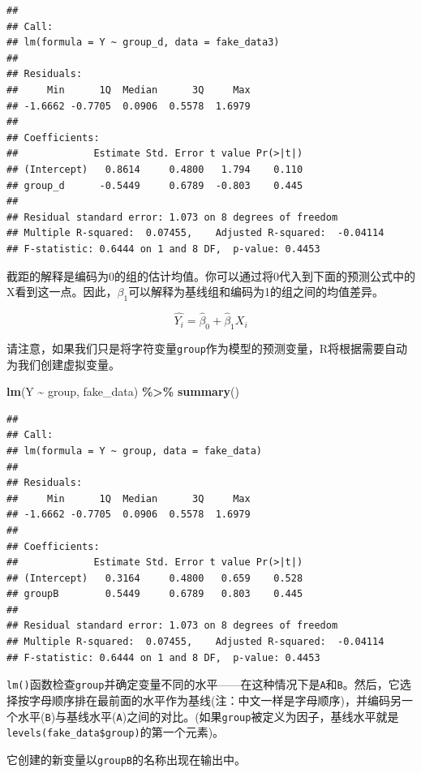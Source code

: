 \documentclass[
]{book}
\newenvironment{Shaded}{\begin{snugshade}}{\end{snugshade}}
\newcommand{\FunctionTok}[1]{\textcolor[rgb]{0.13,0.29,0.53}{\textbf{#1}}}
\newcommand{\NormalTok}[1]{#1}
\newcommand{\SpecialCharTok}[1]{\textcolor[rgb]{0.81,0.36,0.00}{\textbf{#1}}}
\begin{document}
\begin{verbatim}
## 
## Call:
## lm(formula = Y ~ group_d, data = fake_data3)
## 
## Residuals:
##     Min      1Q  Median      3Q     Max 
## -1.6662 -0.7705  0.0906  0.5578  1.6979 
## 
## Coefficients:
##             Estimate Std. Error t value Pr(>|t|)
## (Intercept)   0.8614     0.4800   1.794    0.110
## group_d      -0.5449     0.6789  -0.803    0.445
## 
## Residual standard error: 1.073 on 8 degrees of freedom
## Multiple R-squared:  0.07455,    Adjusted R-squared:  -0.04114 
## F-statistic: 0.6444 on 1 and 8 DF,  p-value: 0.4453
\end{verbatim}

截距的解释是编码为0的组的估计均值。你可以通过将0代入到下面的预测公式中的X看到这一点。因此，\(\beta_1\)可以解释为基线组和编码为1的组之间的均值差异。

\[\hat{Y_i} = \hat{\beta}_0 + \hat{\beta}_1 X_i \]

请注意，如果我们只是将字符变量\texttt{group}作为模型的预测变量，R将根据需要自动为我们创建虚拟变量。

\begin{Shaded}
\begin{Highlighting}[]
\FunctionTok{lm}\NormalTok{(Y }\SpecialCharTok{\textasciitilde{}}\NormalTok{ group, fake\_data) }\SpecialCharTok{\%\textgreater{}\%}
  \FunctionTok{summary}\NormalTok{()}
\end{Highlighting}
\end{Shaded}

\begin{verbatim}
## 
## Call:
## lm(formula = Y ~ group, data = fake_data)
## 
## Residuals:
##     Min      1Q  Median      3Q     Max 
## -1.6662 -0.7705  0.0906  0.5578  1.6979 
## 
## Coefficients:
##             Estimate Std. Error t value Pr(>|t|)
## (Intercept)   0.3164     0.4800   0.659    0.528
## groupB        0.5449     0.6789   0.803    0.445
## 
## Residual standard error: 1.073 on 8 degrees of freedom
## Multiple R-squared:  0.07455,    Adjusted R-squared:  -0.04114 
## F-statistic: 0.6444 on 1 and 8 DF,  p-value: 0.4453
\end{verbatim}

\texttt{lm()}函数检查\texttt{group}并确定变量不同的水平------在这种情况下是\texttt{A}和\texttt{B}。然后，它选择按字母顺序排在最前面的水平作为基线(注：中文一样是字母顺序)，并编码另一个水平(\texttt{B})与基线水平(\texttt{A})之间的对比。(如果\texttt{group}被定义为因子，基线水平就是\texttt{levels(fake\_data\$group)}的第一个元素)。

它创建的新变量以\texttt{groupB}的名称出现在输出中。
\end{document}
